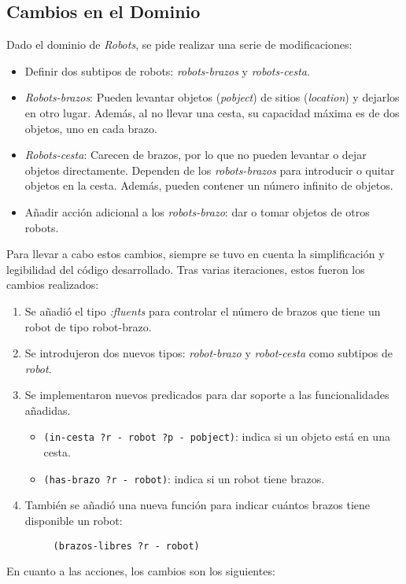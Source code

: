 \documentclass{article}
\begin{document}
 \subsection{Cambios en el Dominio}
 Dado el dominio de \textit{Robots}, se pide realizar una serie de modificaciones:

 \begin{itemize}
     \item Definir dos subtipos de robots: \textit{robots-brazos} y \textit{robots-cesta}.
     \item \textit{Robots-brazos}: Pueden levantar objetos (\textit{pobject}) de sitios (\textit{location}) y dejarlos en otro lugar. Además, al no llevar una cesta, su capacidad máxima es de dos objetos, uno en cada brazo.
     \item \textit{Robots-cesta}: Carecen de brazos, por lo que no pueden levantar o dejar objetos directamente. Dependen de los \textit{robots-brazos} para introducir o quitar objetos en la cesta. Además, pueden contener un número infinito de objetos.
     \item Añadir acción adicional a los \textit{robots-brazo}: dar o tomar objetos de otros robots.
 \end{itemize}
 
 Para llevar a cabo estos cambios, siempre se tuvo en cuenta la simplificación y legibilidad del código desarrollado. Tras varias iteraciones, estos fueron los cambios realizados:
 
 \begin{enumerate}
     \item Se añadió el tipo \textit{:fluents} para controlar el número de brazos que tiene un robot de tipo robot-brazo.
     \item Se introdujeron dos nuevos tipos: \textit{robot-brazo} y \textit{robot-cesta} como subtipos de \textit{robot}.
     \item Se implementaron nuevos predicados para dar soporte a las funcionalidades añadidas. 
 
 
 \begin{itemize}
     \item \texttt{(in-cesta ?r - robot ?p - pobject)}: indica si un objeto está en una cesta.
     \item \texttt{(has-brazo ?r - robot)}: indica si un robot tiene brazos.
 \end{itemize}
 
 \item También se añadió una nueva función para indicar cuántos brazos tiene disponible un robot:
 \begin{verbatim}
     (brazos-libres ?r - robot)
 \end{verbatim}
\end{enumerate}
 En cuanto a las acciones, los cambios son los siguientes:
 
\end{document}

